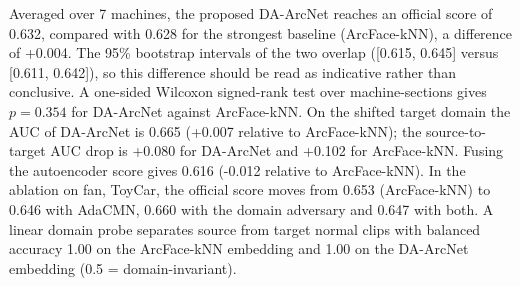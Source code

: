 Averaged over 7 machines, the proposed DA-ArcNet reaches an official score of 0.632, compared with 0.628 for the strongest baseline (ArcFace-kNN), a difference of +0.004.
The 95\% bootstrap intervals of the two overlap ([0.615, 0.645] versus [0.611, 0.642]), so this difference should be read as indicative rather than conclusive.
A one-sided Wilcoxon signed-rank test over machine-sections gives $p=0.354$ for DA-ArcNet against ArcFace-kNN.
On the shifted target domain the AUC of DA-ArcNet is 0.665 (+0.007 relative to ArcFace-kNN); the source-to-target AUC drop is +0.080 for DA-ArcNet and +0.102 for ArcFace-kNN.
Fusing the autoencoder score gives 0.616 (-0.012 relative to ArcFace-kNN).
In the ablation on fan, ToyCar, the official score moves from 0.653 (ArcFace-kNN) to 0.646 with AdaCMN, 0.660 with the domain adversary and 0.647 with both.
A linear domain probe separates source from target normal clips with balanced accuracy 1.00 on the ArcFace-kNN embedding and 1.00 on the DA-ArcNet embedding (0.5 = domain-invariant).
